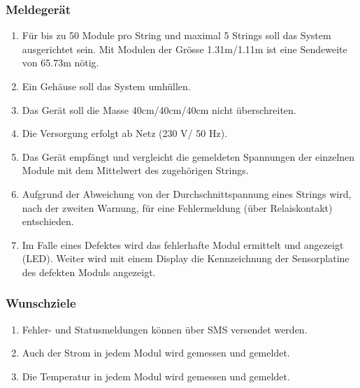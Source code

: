\subsubsection{Meldegerät}
\begin{enumerate}
\item	Für bis zu 50 Module pro String und maximal 5 Strings soll das System ausgerichtet sein. Mit Modulen der Grösse 1.31m/1.11m ist eine Sendeweite von 65.73m nötig.
\item	Ein Gehäuse soll das  System umhüllen.
\item Das Gerät soll die Masse 40cm/40cm/40cm nicht überschreiten.
\item	Die Versorgung erfolgt ab Netz (230 V/ 50 Hz).
\item	Das Gerät empfängt und vergleicht die gemeldeten Spannungen der einzelnen Module mit dem Mittelwert des zugehörigen Strings.
\item	Aufgrund der Abweichung von der Durchschnittspannung eines Strings wird, nach der zweiten Warnung, für eine Fehlermeldung (über Relaiskontakt) entschieden.
\item	Im Falle eines Defektes wird das fehlerhafte Modul ermittelt und angezeigt (LED). Weiter wird mit einem Display die Kennzeichnung der Sensorplatine des defekten Moduls angezeigt.
\end{enumerate}

\subsubsection{Wunschziele}
\begin{enumerate}
\item	Fehler- und Statusmeldungen können über SMS versendet werden.
\item	Auch der Strom in jedem Modul wird gemessen und gemeldet.
\item	Die Temperatur in jedem Modul wird gemessen und gemeldet.
\end{enumerate}

